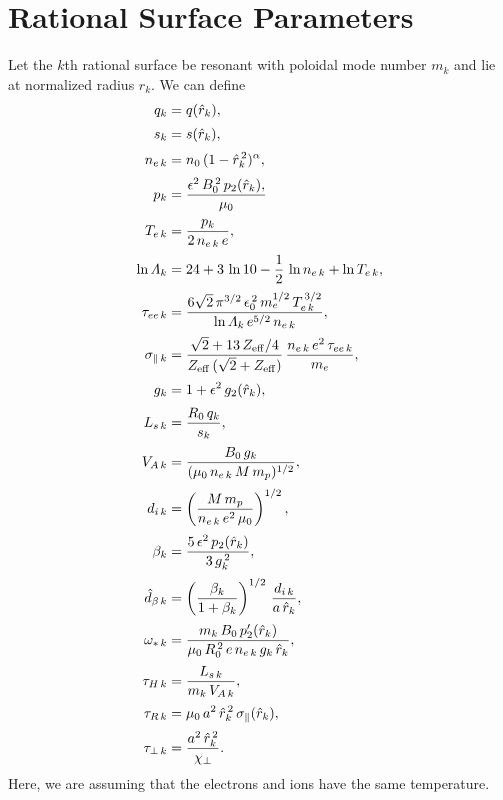 \documentclass[12pt,prb,aps,notitlepage]{revtex4-1}
\begin{document}
\section{Rational Surface Parameters}
Let the $k$th rational surface be resonant with poloidal mode number $m_k$ and lie at normalized radius $\hat{r}_k$. 
We can define
\begin{align}
q_k &= q(\hat{r}_k),\\[0.5ex]
s_k&= s(\hat{r}_k),\\[0.5ex]
n_{e\,k} &= n_0\,(1-\hat{r}_k^{\,2})^\alpha,\\[0.5ex]
p_k &= \frac{\epsilon^2\,B_0^{\,2}\,p_2(\hat{r}_k),}{\mu_0}\\[0.5ex]
T_{e\,k} &= \frac{p_k}{2\,n_{e\,k}\,e},\\[0.5ex]
\ln{\mit\Lambda}_k &= 24 + 3\,\ln 10-\frac{1}{2}\,\ln n_{e\,k} + \ln T_{e\,k},\\[0.5ex]
\tau_{ee\,k}&= \frac{6\sqrt{2}\,\pi^{3/2}\,\epsilon_0^{\,2}\,m_e^{1/2}\,T_{e\,k}^{\,3/2}}{\ln{\mit\Lambda}_k\,e^{5/2}\,n_{e\,k}},\\[0.5ex]
\sigma_{\parallel\,k} &= \frac{\sqrt{2}+13\,Z_{\rm eff}/4}{Z_{\rm eff}\,(\sqrt{2}+Z_{\rm eff})}\,\frac{n_{e\,k}\,e^2\,\tau_{ee\,k}}{m_e},\\[0.5ex]
g_k &= 1+ \epsilon^2\,g_2(\hat{r}_k),\\[0.5ex]
L_{s\,k} &= \frac{R_0\,q_k}{s_k},\\[0.5ex]
V_{A\,k} &= \frac{B_0\,g_k}{(\mu_0\,n_{e\,k}\,M\,m_p)^{1/2}},\\[0.5ex]
d_{i\,k} &= \left(\frac{M\,m_p}{n_{e\,k}\,e^2\,\mu_0}\right)^{1/2},\\[0.5ex]
\beta_k &= \frac{5\,\epsilon^2\,p_2(\hat{r}_k)}{3\,g_k^{\,2}},\\[0.5ex]
\hat{d}_{\beta\,k} &= \left(\frac{\beta_k}{1+\beta_k}\right)^{1/2}\,\frac{d_{i\,k}}{a\,\hat{r}_k},\\[0.5ex]
\omega_{\ast\,k} &= \frac{m_k\,B_0\,p_2'(\hat{r}_k)}{\mu_0\,R_0^{\,2}\,e\,n_{e\,k}\,g_k\,\hat{r}_k}, \\[0.5ex]
\tau_{H\,k} &= \frac{L_{s\,k}}{m_k\,V_{A\,k}},\\[0.5ex]
\tau_{R\,k} &= \mu_0\,a^2\,\hat{r}_k^{\,2}\,\sigma_\parallel(\hat{r}_k),\\[0.5ex]
\tau_{\perp\,k} &= \frac{a^2\,\hat{r}_k^{\,2}}{\chi_\perp}.
\end{align}
Here, we are assuming that the electrons and ions have the same temperature. 
\end{document}
